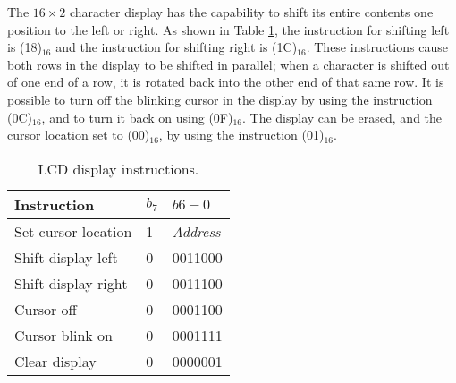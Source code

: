 The $16 \times 2$ character display has the capability to shift its 
entire contents one position to the left
or right. As shown in Table \ref{tab:LCD}, the instruction for shifting left is
(18)$_{16}$ and the instruction for shifting right is (1C)$_{16}$. These instructions
cause both rows in the display to be shifted in parallel; when a character is shifted out
of one end of a row, it is rotated back into the other end of that same row. It is
possible to turn off the blinking cursor in the display by using the instruction (0C)$_{16}$, and
to turn it back on using (0F)$_{16}$. The display can be erased, and the cursor
location set to (00)$_{16}$, by using the instruction (01)$_{16}$.

\begin{table}[h]
    \begin{center}
    \begin{tabular}{l|ll}
            \textbf{Instruction} &
            \textbf{$b_7$} & \textbf{$b{6-0}$}
        \\\hline
            Set cursor location & 1 & {\it Address}
        \\
            Shift display left & 0 & 0011000
        \\
            Shift display right & 0 & 0011100
        \\
            Cursor off & 0 & 0001100
        \\
            Cursor blink on & 0 & 0001111
        \\
            Clear display & 0 & 0000001
        \\
    \end{tabular}
    \caption{LCD display instructions.}
	 \label{tab:LCD}
    \end{center}
\end{table}
